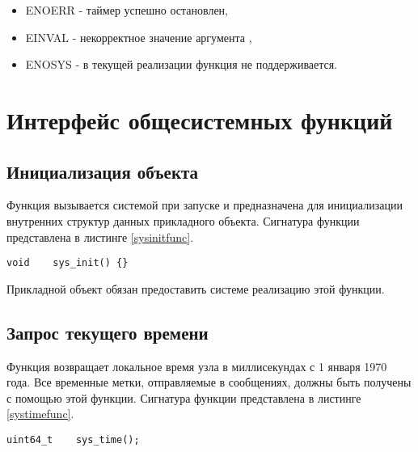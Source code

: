 {\itshape
\begin{itemize}
\item ENOERR - таймер успешно остановлен,
\item EINVAL - некорректное значение аргумента ,
\item ENOSYS - в текущей реализации функция не поддерживается.
\end{itemize}
}

\section{Интерфейс общесистемных функций}

\subsection{Инициализация объекта}

Функция  вызывается системой \zigzag при запуске и предназначена
для инициализации внутренних структур данных прикладного объекта. Сигнатура функции
представлена в листинге \ref{sysinitfunc}.

\begin{lstlisting}[caption=\myfunc{sys\_init()} - инициализация системы, label=sysinitfunc ]
    void    sys_init() {}
\end{lstlisting}

Прикладной объект обязан предоставить системе \zigzag реализацию этой функции.

\subsection{Запрос текущего времени}

Функция  возвращает локальное время узла в миллисекундах с 1 января 1970 года.
Все временные метки, отправляемые в сообщениях, должны быть получены с помощью этой функции.
Сигнатура функции представлена в листинге \ref{systimefunc}.

\begin{lstlisting}[caption=\myfunc{sys\_time()} - текущее время, label=systimefunc ]
    uint64_t    sys_time();
\end{lstlisting}


